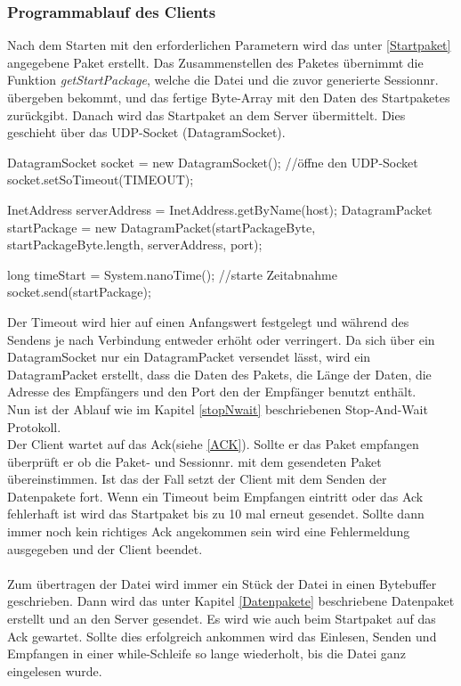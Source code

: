 \documentclass[a4paper, 12pt]{scrartcl}
\begin{document}
\subsubsection{Programmablauf des Clients}
Nach dem Starten mit den erforderlichen Parametern wird das unter \ref{Startpaket} angegebene Paket erstellt. Das Zusammenstellen des Paketes übernimmt die Funktion \textit{getStartPackage}, welche die Datei und die zuvor generierte Sessionnr. übergeben bekommt, und das fertige Byte-Array mit den Daten des Startpaketes zurückgibt. Danach wird das Startpaket an dem Server übermittelt. Dies geschieht über das UDP-Socket (DatagramSocket).
\begin{javacode}
DatagramSocket socket = new DatagramSocket();   //öffne den UDP-Socket
socket.setSoTimeout(TIMEOUT);					

InetAddress serverAddress = InetAddress.getByName(host);
DatagramPacket startPackage = 
	           new DatagramPacket(startPackageByte, startPackageByte.length, serverAddress, port);
	        
long timeStart = System.nanoTime();	//starte Zeitabnahme
socket.send(startPackage);
\end{javacode}
Der Timeout wird hier auf einen Anfangswert festgelegt und während des Sendens je nach Verbindung entweder erhöht oder verringert.
Da sich über ein DatagramSocket nur ein DatagramPacket versendet lässt, wird ein DatagramPacket erstellt, dass die Daten des Pakets, die Länge der Daten, die Adresse des Empfängers und den Port den der Empfänger benutzt enthält.\\
Nun ist der Ablauf wie im Kapitel \ref{stopNwait} beschriebenen Stop-And-Wait Protokoll.\\
Der Client wartet auf das Ack(siehe \ref{ACK}). Sollte er das Paket empfangen überprüft er ob die Paket- und Sessionnr. mit dem gesendeten Paket übereinstimmen. Ist das der Fall setzt der Client mit dem Senden der Datenpakete fort. Wenn ein Timeout beim Empfangen eintritt oder das Ack fehlerhaft ist wird das Startpaket bis zu 10 mal erneut gesendet. Sollte dann immer noch kein richtiges Ack angekommen sein wird eine Fehlermeldung ausgegeben und der Client beendet.
\\\\
Zum übertragen der Datei wird immer ein Stück der Datei in einen Bytebuffer geschrieben. Dann wird das unter Kapitel \ref{Datenpakete} beschriebene Datenpaket erstellt und an den Server gesendet. Es wird wie auch beim Startpaket auf das Ack gewartet. Sollte dies erfolgreich ankommen wird das Einlesen, Senden und Empfangen in einer while-Schleife so lange wiederholt, bis die Datei ganz eingelesen wurde.  
\end{document}
